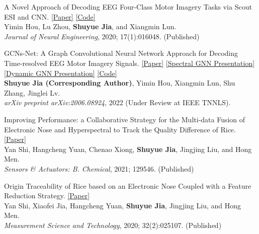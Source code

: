 \documentclass{my_cv}
\begin{document}
\hspace*{\fill}

\workitemsone
{A Novel Approach of Decoding EEG Four-Class Motor Imagery Tasks via Scout ESI and CNN. \href{https://iopscience.iop.org/article/10.1088/1741-2552/ab4af6/meta}{[Paper]} \href{https://github.com/SuperBruceJia/EEG-Motor-Imagery-Classification-CNNs-TensorFlow}{[Code]}\\
	Yimin Hou, Lu Zhou, \textbf{Shuyue Jia}, and Xiangmin Lun. \\
	\emph{Journal of Neural Engineering}, 2020; 17(1):016048. (Published)
}

\hspace*{\fill}

\workitemsone
{GCNs-Net: A Graph Convolutional Neural Network Approach for Decoding Time-resolved EEG Motor Imagery Signals. \href{https://arxiv.org/abs/2006.08924}{[Paper]} \href{https://shuyuej.com/files/GCNs-Net.pdf}{[Spectral GNN Presentation]} \href{https://shuyuej.com/files/Dynamic-GCN-Survey.pdf}{[Dynamic GNN Presentation]} \href{https://github.com/SuperBruceJia/EEG-DL}{[Code]}\\
	\textbf{Shuyue Jia (Corresponding Author)}, Yimin Hou, Xiangmin Lun, Shu Zhang, Jinglei Lv. \\
	\emph{arXiv preprint arXiv:2006.08924}, 2022 (Under Review at IEEE TNNLS).
}

\hspace*{\fill} 

\workitemsone
{Improving Performance: a Collaborative Strategy for the Multi-data Fusion of Electronic Nose and Hyperspectral to Track the Quality Difference of Rice. \href{https://www.sciencedirect.com/science/article/abs/pii/S0925400521001143}{[Paper]} \\
	Yan Shi, Hangcheng Yuan, Chenao Xiong, \textbf{Shuyue Jia}, Jingjing Liu, and Hong Men.\\
	\emph{Sensors \& Actuators: B. Chemical}, 2021; 129546. (Published)
}
	
\hspace*{\fill}

\workitemsone
{Origin Traceability of Rice based on an Electronic Nose Coupled with a Feature Reduction Strategy. \href{https://iopscience.iop.org/article/10.1088/1361-6501/abb9e7/meta}{[Paper]} \\
	Yan Shi, Xiaofei Jia, Hangcheng Yuan, \textbf{Shuyue Jia}, Jingjing Liu, and Hong Men.\\
	\emph{Measurement Science and Technology}, 2020; 32(2):025107. (Published)
}
	
\end{document}
